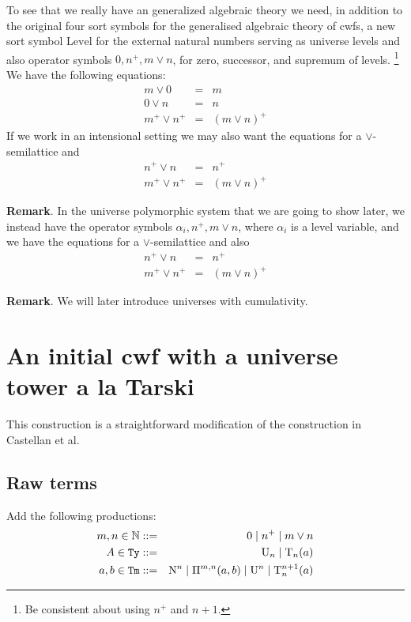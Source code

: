 \documentclass{lmcs}
\newcommand{\Ta}{\mathrm{T}}
\newcommand{\Tan}{\Ta_n}
\newcommand{\Un}{\U_n}
\newcommand{\Nhatn}{\N^n}
\newcommand{\Level}{\mathrm{Level}}
\begin{document}
To see that we really have an generalized algebraic theory we need, in addition to the original four sort symbols for the generalised algebraic theory of cwfs, a new sort symbol $\Level$
for the external natural numbers serving as universe levels and also operator symbols $0, n^+, m \vee n$, for zero, successor, and supremum of levels. \footnote{Be consistent about using $n^+$ and $n+1$.} We have the following equations:
\begin{eqnarray*}
m \vee 0 &=&m\\
0 \vee n &=& n\\
m^+ \vee n^+ &=& (m \vee n)^+
\end{eqnarray*}
If we work in an intensional setting we may also want the equations for a $\vee$-semilattice and
\begin{eqnarray*}
n^+ \vee n &=& n^+\\
m^+ \vee n^+ &=& (m \vee n)^+
\end{eqnarray*}

{\bf Remark}. In the universe polymorphic system that we are going to show later, we instead have the operator symbols $\alpha_i, n^+, m \vee n$, where $\alpha_i$ is a level variable, and we have the equations for a $\vee$-semilattice and also 
\begin{eqnarray*}
n^+ \vee n &=& n^+\\
m^+ \vee n^+ &=& (m \vee n)^+
\end{eqnarray*}

{\bf Remark}. We will later introduce universes with cumulativity.

\section{An initial cwf with a universe tower a la Tarski}

This construction is a straightforward modification of the construction in Castellan et al. 

\subsection{Raw terms}

Add the following productions:
\begin{eqnarray*}
m, n \in \mathbb{N} &::=& 0 \mid n^+ \mid m \vee n\\
A \in \RawTy &::=& \Un \mid \Tan(a)\\
a,b \in \RawTm &::=&  \Nhatn \mid \Pi^{m,n}(a,b) \mid \U^n \mid \Ta_n^{n+1}(a)
\end{eqnarray*}
\end{document}
